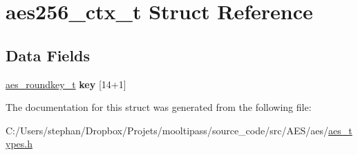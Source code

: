 \hypertarget{structaes256__ctx__t}{\section{aes256\-\_\-ctx\-\_\-t Struct Reference}
\label{structaes256__ctx__t}
}
\subsection*{Data Fields}
\begin{DoxyCompactItemize}
\item 
\hypertarget{structaes256__ctx__t_aac9ff4933a314ba93b4bec6e92199d17}{\hyperlink{structaes__roundkey__t}{aes\-\_\-roundkey\-\_\-t} {\bfseries key} \mbox{[}14+1\mbox{]}}\label{structaes256__ctx__t_aac9ff4933a314ba93b4bec6e92199d17}

\end{DoxyCompactItemize}


The documentation for this struct was generated from the following file\-:\begin{DoxyCompactItemize}
\item 
C\-:/\-Users/stephan/\-Dropbox/\-Projets/mooltipass/source\-\_\-code/src/\-A\-E\-S/aes/\hyperlink{aes__types_8h}{aes\-\_\-types.\-h}\end{DoxyCompactItemize}
